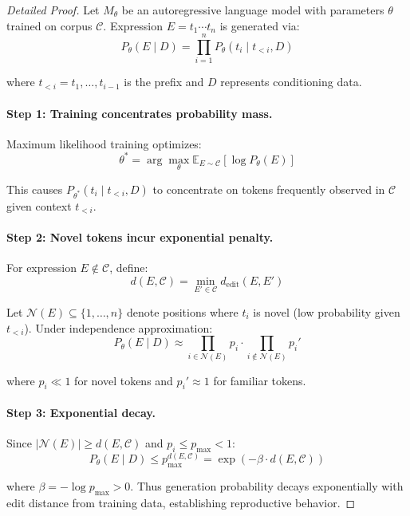 \documentclass[twoside,11pt]{article}
\providecommand{\qed}{\hfill\BlackBox}
\begin{document}
\begin{proof}[Detailed Proof]
Let $M_\theta$ be an autoregressive language model with parameters $\theta$ trained on corpus $\mathcal{C}$. Expression $E = t_1 \cdots t_n$ is generated via:
\[
P_\theta(E \mid D) = \prod_{i=1}^n P_\theta(t_i \mid t_{<i}, D)
\]

where $t_{<i} = t_1, \ldots, t_{i-1}$ is the prefix and $D$ represents conditioning data.

\paragraph{Step 1: Training concentrates probability mass.}

Maximum likelihood training optimizes:
\[
\theta^* = \arg\max_\theta \mathbb{E}_{E \sim \mathcal{C}}[\log P_\theta(E)]
\]

This causes $P_{\theta^*}(t_i \mid t_{<i}, D)$ to concentrate on tokens frequently observed in $\mathcal{C}$ given context $t_{<i}$.

\paragraph{Step 2: Novel tokens incur exponential penalty.}

For expression $E \notin \mathcal{C}$, define:
\[
d(E, \mathcal{C}) = \min_{E' \in \mathcal{C}} d_{\text{edit}}(E, E')
\]

Let $\mathcal{N}(E) \subseteq \{1, \ldots, n\}$ denote positions where $t_i$ is novel (low probability given $t_{<i}$). Under independence approximation:
\[
P_\theta(E \mid D) \approx \prod_{i \in \mathcal{N}(E)} p_i \cdot \prod_{i \notin \mathcal{N}(E)} p_i'
\]

where $p_i \ll 1$ for novel tokens and $p_i' \approx 1$ for familiar tokens.

\paragraph{Step 3: Exponential decay.}

Since $|\mathcal{N}(E)| \geq d(E, \mathcal{C})$ and $p_i \leq p_{\max} < 1$:
\[
P_\theta(E \mid D) \leq p_{\max}^{d(E, \mathcal{C})} = \exp(-\beta \cdot d(E, \mathcal{C}))
\]

where $\beta = -\log p_{\max} > 0$. Thus generation probability decays exponentially with edit distance from training data, establishing reproductive behavior. \qed
\end{proof}
\end{document}
